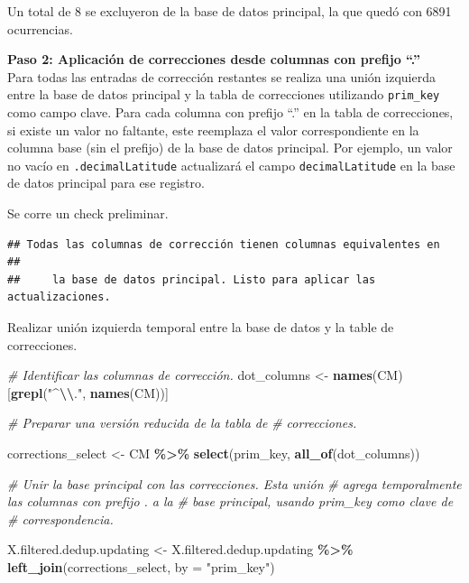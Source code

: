 \documentclass[sn-apa,pdflatex]{sn-jnl}
\newenvironment{Shaded}{\begin{snugshade}}{\end{snugshade}}
\newcommand{\AttributeTok}[1]{\textcolor[rgb]{0.13,0.29,0.53}{#1}}
\newcommand{\CommentTok}[1]{\textcolor[rgb]{0.56,0.35,0.01}{\textit{#1}}}
\newcommand{\FunctionTok}[1]{\textcolor[rgb]{0.13,0.29,0.53}{\textbf{#1}}}
\newcommand{\NormalTok}[1]{#1}
\newcommand{\OtherTok}[1]{\textcolor[rgb]{0.56,0.35,0.01}{#1}}
\newcommand{\SpecialCharTok}[1]{\textcolor[rgb]{0.81,0.36,0.00}{\textbf{#1}}}
\newcommand{\StringTok}[1]{\textcolor[rgb]{0.31,0.60,0.02}{#1}}
\begin{document}
Un total de 8 se excluyeron de la base de datos principal, la que quedó
con 6891 ocurrencias.

\textbf{Paso 2: Aplicación de correcciones desde columnas con prefijo
``.''}\\
Para todas las entradas de corrección restantes se realiza una unión
izquierda entre la base de datos principal y la tabla de correcciones
utilizando \texttt{prim\_key} como campo clave. Para cada columna con
prefijo ``.'' en la tabla de correcciones, si existe un valor no
faltante, este reemplaza el valor correspondiente en la columna base
(sin el prefijo) de la base de datos principal. Por ejemplo, un valor no
vacío en \texttt{.decimalLatitude} actualizará el campo
\texttt{decimalLatitude} en la base de datos principal para ese
registro.

Se corre un check preliminar.

\begin{verbatim}
## Todas las columnas de corrección tienen columnas equivalentes en 
## 
##     la base de datos principal. Listo para aplicar las actualizaciones.
\end{verbatim}

Realizar unión izquierda temporal entre la base de datos y la table de
correcciones.

\begin{Shaded}
\begin{Highlighting}[]
\CommentTok{\# Identificar las columnas de corrección.}
\NormalTok{dot\_columns }\OtherTok{\textless{}{-}} \FunctionTok{names}\NormalTok{(CM)[}\FunctionTok{grepl}\NormalTok{(}\StringTok{"\^{}}\SpecialCharTok{\textbackslash{}\textbackslash{}}\StringTok{."}\NormalTok{, }\FunctionTok{names}\NormalTok{(CM))]}

\CommentTok{\# Preparar una versión reducida de la tabla de}
\CommentTok{\# correcciones.}

\NormalTok{corrections\_select }\OtherTok{\textless{}{-}}\NormalTok{ CM }\SpecialCharTok{\%\textgreater{}\%}
    \FunctionTok{select}\NormalTok{(prim\_key, }\FunctionTok{all\_of}\NormalTok{(dot\_columns))}


\CommentTok{\# Unir la base principal con las correcciones.  Esta unión}
\CommentTok{\# agrega temporalmente las columnas con prefijo \textquotesingle{}.\textquotesingle{} a la}
\CommentTok{\# base principal, usando \textasciigrave{}prim\_key\textasciigrave{} como clave de}
\CommentTok{\# correspondencia.}

\NormalTok{X.filtered.dedup.updating }\OtherTok{\textless{}{-}}\NormalTok{ X.filtered.dedup.updating }\SpecialCharTok{\%\textgreater{}\%}
    \FunctionTok{left\_join}\NormalTok{(corrections\_select, }\AttributeTok{by =} \StringTok{"prim\_key"}\NormalTok{)}
\end{Highlighting}
\end{Shaded}
\end{document}
